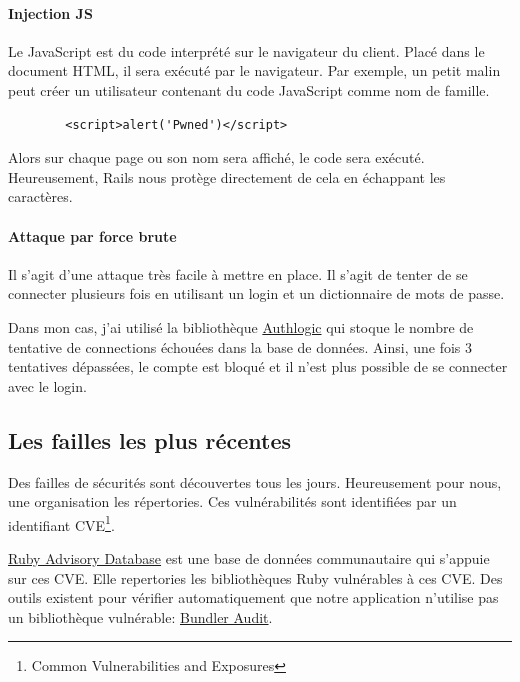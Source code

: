 \documentclass[]{report}
\begin{document}
      \paragraph{Injection JS}

        Le JavaScript est du code interprété sur le navigateur du client. Placé dans le document HTML, il sera exécuté par le navigateur. Par exemple, un petit malin peut créer un utilisateur contenant du code JavaScript comme nom de famille.

        \begin{scriptsize}
        \begin{verbatim}
        <script>alert('Pwned')</script>
        \end{verbatim}
        \end{scriptsize}

        Alors sur chaque page ou son nom sera affiché, le code sera exécuté. Heureusement, Rails nous protège directement de cela en échappant les caractères.

      \paragraph{Attaque par force brute}

        Il s'agit d'une attaque très facile à mettre en place. Il s'agit de tenter de se connecter plusieurs fois en utilisant un login et un dictionnaire de mots de passe.

        Dans mon cas, j'ai utilisé la bibliothèque \href{https://github.com/binarylogic/authlogic}{Authlogic} qui stoque le nombre de tentative de connections échouées dans la base de données. Ainsi, une fois 3 tentatives dépassées, le compte est bloqué et il n'est plus possible de se connecter avec le login.

    \subsection{Les failles les plus récentes}

      Des failles de sécurités sont découvertes tous les jours. Heureusement pour nous, une organisation les répertories. Ces vulnérabilités sont identifiées par un identifiant CVE\footnote{Common Vulnerabilities and Exposures}.

      \href{https://github.com/rubysec/ruby-advisory-db}{Ruby Advisory Database} est une base de données communautaire qui s'appuie sur ces CVE. Elle repertories les bibliothèques Ruby vulnérables à ces CVE. Des outils existent pour vérifier automatiquement que notre application n'utilise pas un bibliothèque vulnérable: \href{https://github.com/rubysec/bundler-audit}{Bundler Audit}.
\end{document}
